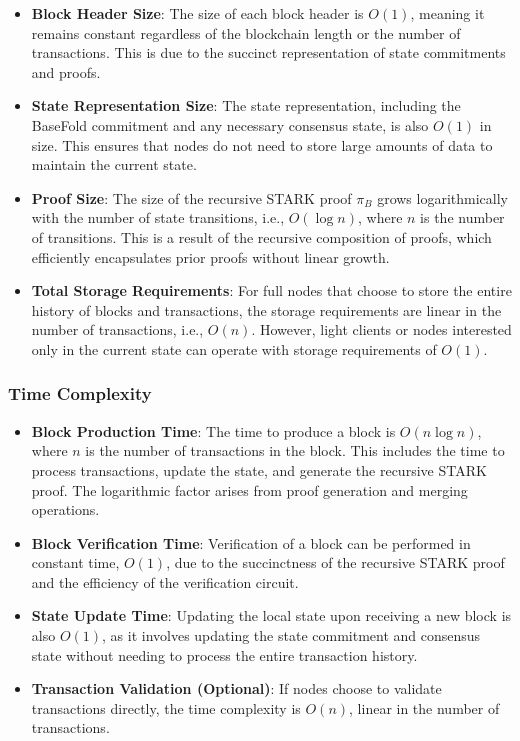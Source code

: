 \documentclass{article}
\theoremstyle{plain}
\theoremstyle{definition}
\theoremstyle{remark}
\theoremstyle{problem}
\begin{document}
\begin{itemize}
    \item \textbf{Block Header Size}: The size of each block header is $O(1)$, meaning it remains constant regardless of the blockchain length or the number of transactions. This is due to the succinct representation of state commitments and proofs.

    \item \textbf{State Representation Size}: The state representation, including the BaseFold commitment and any necessary consensus state, is also $O(1)$ in size. This ensures that nodes do not need to store large amounts of data to maintain the current state.

    \item \textbf{Proof Size}: The size of the recursive STARK proof $\pi_B$ grows logarithmically with the number of state transitions, i.e., $O(\log n)$, where $n$ is the number of transitions. This is a result of the recursive composition of proofs, which efficiently encapsulates prior proofs without linear growth.

    \item \textbf{Total Storage Requirements}: For full nodes that choose to store the entire history of blocks and transactions, the storage requirements are linear in the number of transactions, i.e., $O(n)$. However, light clients or nodes interested only in the current state can operate with storage requirements of $O(1)$.
\end{itemize}

\subsubsection{Time Complexity}

\begin{itemize}
    \item \textbf{Block Production Time}: The time to produce a block is $O(n \log n)$, where $n$ is the number of transactions in the block. This includes the time to process transactions, update the state, and generate the recursive STARK proof. The logarithmic factor arises from proof generation and merging operations.

    \item \textbf{Block Verification Time}: Verification of a block can be performed in constant time, $O(1)$, due to the succinctness of the recursive STARK proof and the efficiency of the verification circuit.

    \item \textbf{State Update Time}: Updating the local state upon receiving a new block is also $O(1)$, as it involves updating the state commitment and consensus state without needing to process the entire transaction history.

    \item \textbf{Transaction Validation (Optional)}: If nodes choose to validate transactions directly, the time complexity is $O(n)$, linear in the number of transactions.
\end{itemize}
\end{document}
